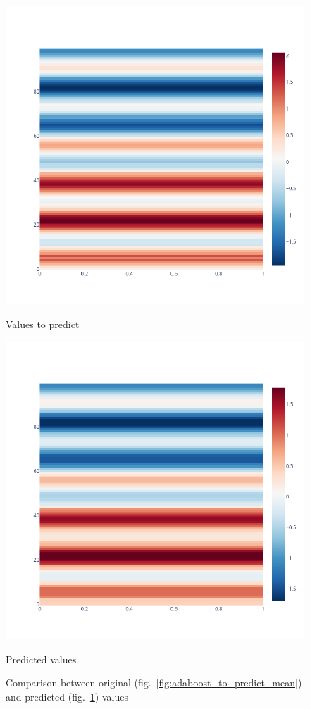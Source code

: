 \documentclass[11pt]{article}
\begin{document}
\begin{figure}
\begin{minipage}{0.4\linewidth}
    \includegraphics[width=\linewidth]{figure/adaboost/to_predict_adaboost_mean.png}
    \caption{Values to predict}
    \label{fig:adaboost_to_predict_mean}
\end{minipage}
\begin{minipage}{0.4\linewidth}
    \includegraphics[width=\linewidth]{figure/adaboost/predict_adaboost_zoom_mean.png}
    \caption{Predicted values}
    \label{fig:adaboost_predicted_mean}
\end{minipage}
\caption{Comparison between original (fig.~\ref{fig:adaboost_to_predict_mean}) and predicted (fig.~\ref{fig:adaboost_predicted_mean}) values}
\end{figure}
\end{document}
